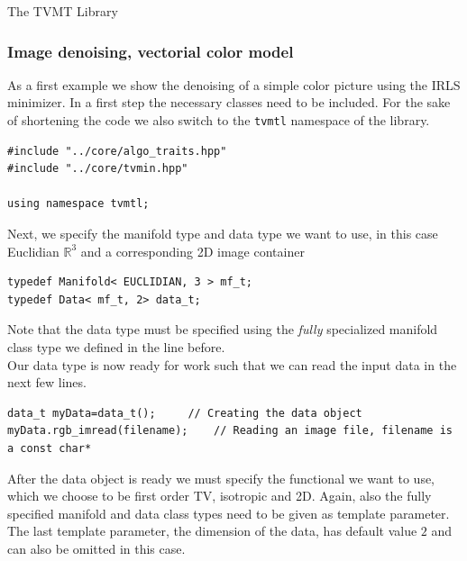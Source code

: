 \begin{chapter}{The TVMT Library}
\subsubsection{Image denoising, vectorial color model} %
\label{ssub:Image denoising, vectorial color model}
As a first example we show the denoising of a simple color picture using the IRLS minimizer. In a first step the necessary classes need to be included. For the sake of shortening the 
code we also switch to the \texttt{tvmtl} namespace of the library. \\
\cppinline
\begin{lstlisting}[label=code:tut_include,caption={Inclusion of library headers}]
#include "../core/algo_traits.hpp"
#include "../core/tvmin.hpp"

using namespace tvmtl;
\end{lstlisting}

Next, we specify the manifold type and data type we want to use, in this case Euclidian $\mathbb{R}^3$ and a corresponding 2D image container\\

\cppinline
\begin{lstlisting}[label=code:tut_typedef,caption={Specification of manifold and data type}]
typedef Manifold< EUCLIDIAN, 3 > mf_t;
typedef Data< mf_t, 2> data_t;
\end{lstlisting}

Note that the data type must be specified using the \textit{fully} specialized manifold class type we defined in the line before.\\
Our data type is now ready for work such that we can read the input data in the next few lines.\\

\cppinline
\begin{lstlisting}[label=code:tut_data,caption={Initialization and input of image data}]
data_t myData=data_t();		// Creating the data object
myData.rgb_imread(filename);	// Reading an image file, filename is a const char*
\end{lstlisting}

After the data object is ready we must specify the functional we want to use, which we choose to be first order TV, isotropic and 2D. Again,
also the fully specified manifold and data class types need to be given as template parameter. The last template parameter, the dimension of the data, 
has default value $2$ and can also be omitted in this case.\\


\end{chapter}
